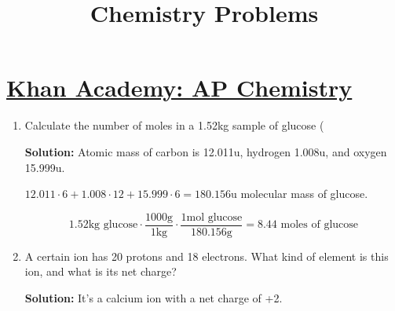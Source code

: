 \documentclass{article}
\title{Chemistry Problems}
\begin{document}
\maketitle

\section{\href{https://www.khanacademy.org/science/ap-chemistry}{Khan Academy: AP Chemistry}}

\begin{enumerate}
    \item Calculate the number of moles in a 1.52kg sample of glucose (
    
    \textbf{Solution:} Atomic mass of carbon is 12.011u, hydrogen 1.008u, and oxygen 15.999u.
    
    \(12.011\cdot6+1.008\cdot12+15.999\cdot6=180.156\)u molecular mass of glucose.
    
    \[1.52\text{kg glucose} \cdot \frac{1000\text{g}}{1\text{kg}} \cdot \frac{1\text{mol glucose}}{180.156\text{g}}=8.44\text{ moles of glucose}\]
    
    \item A certain ion has 20 protons and 18 electrons. What kind of element is this ion, and what is its net charge?
    
    \textbf{Solution:} It's a calcium ion with a net charge of +2.
    
\end{enumerate}
\end{document}
